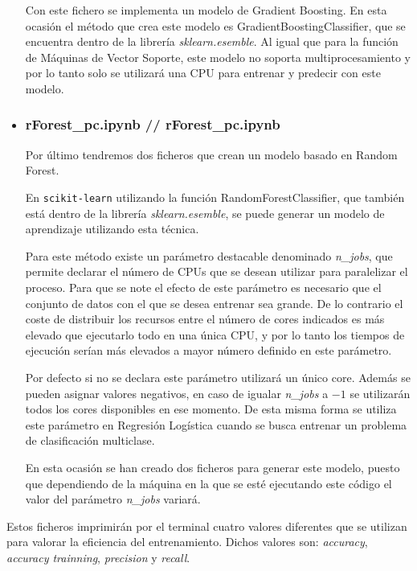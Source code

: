 \documentclass[a4paper, 12pt]{book}
\begin{document}
\begin{itemize}
Con este fichero se implementa un modelo de Gradient Boosting. En esta ocasión el método que crea este modelo es GradientBoostingClassifier\cite{GradientTreeBDoc}, que se encuentra dentro de la librería \textit{sklearn.esemble}. Al igual que para la función de Máquinas de Vector Soporte, este modelo no soporta multiprocesamiento y por lo tanto solo se utilizará una CPU para entrenar y predecir con este modelo. 
\item \subsubsection{rForest\_pc.ipynb // rForest\_pc.ipynb} 
\label{subsubsub:rForest}

Por último tendremos dos ficheros que crean un modelo basado en Random Forest.

En \texttt{scikit-learn} utilizando la función RandomForestClassifier\cite{RandomForestDoc}, que también está dentro de la librería \textit{sklearn.esemble}, se puede generar un modelo de aprendizaje utilizando esta técnica.

Para este método existe un parámetro destacable denominado \textit{n\_jobs}, que permite declarar el número de CPUs que se desean utilizar para paralelizar el proceso. Para que se note el efecto de este parámetro es necesario que el conjunto de datos con el que se desea entrenar sea grande. De lo contrario el coste de distribuir los recursos entre el número de cores indicados es más elevado que ejecutarlo todo en una única CPU, y por lo tanto los tiempos de ejecución serían más elevados a mayor número definido en este parámetro.

Por defecto si no se declara este parámetro utilizará un único core. Además se pueden asignar valores negativos, en caso de igualar \textit{n\_jobs} a $-1$ se utilizarán todos los cores disponibles en ese momento. De esta misma forma se utiliza este parámetro en Regresión Logística cuando se busca entrenar un problema de clasificación multiclase.

En esta ocasión se han creado dos ficheros para generar este modelo, puesto que dependiendo de la máquina en la que se esté ejecutando este código el valor del parámetro \textit{n\_jobs} variará. 

\end{itemize}

Estos ficheros imprimirán por el terminal cuatro valores diferentes que se utilizan para valorar la eficiencia del entrenamiento. Dichos valores son: \textit{accuracy}, \textit{accuracy trainning}, \textit{precision} y \textit{recall}. 
\end{document}
